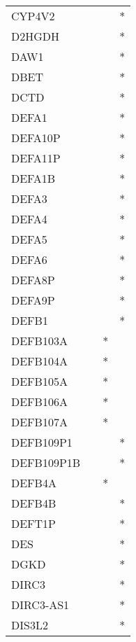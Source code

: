 \begin{longtable}{lccc}
CYP4V2         &           &     &       * \\
D2HGDH         &           &     &       * \\
DAW1           &           &     &       * \\
DBET           &           &     &       * \\
DCTD           &           &     &       * \\
DEFA1          &           &     &       * \\
DEFA10P        &           &     &       * \\
DEFA11P        &           &     &       * \\
DEFA1B         &           &     &       * \\
DEFA3          &           &     &       * \\
DEFA4          &           &     &       * \\
DEFA5          &           &     &       * \\
DEFA6          &           &     &       * \\
DEFA8P         &           &     &       * \\
DEFA9P         &           &     &       * \\
DEFB1          &           &     &       * \\
DEFB103A       &           &   * &         \\
DEFB104A       &           &   * &         \\
DEFB105A       &           &   * &         \\
DEFB106A       &           &   * &         \\
DEFB107A       &           &   * &         \\
DEFB109P1      &           &     &       * \\
DEFB109P1B     &           &     &       * \\
DEFB4A         &           &   * &         \\
DEFB4B         &           &     &       * \\
DEFT1P         &           &     &       * \\
DES            &           &     &       * \\
DGKD           &           &     &       * \\
DIRC3          &           &     &       * \\
DIRC3-AS1      &           &     &       * \\
DIS3L2         &           &     &       * \\

\end{longtable}
